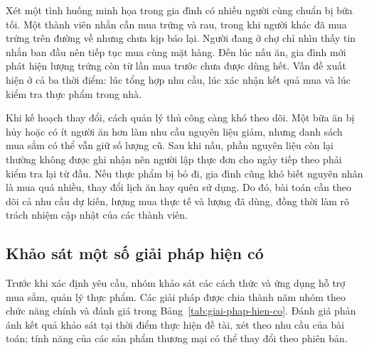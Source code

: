
Xét một tình huống minh họa trong gia đình có nhiều người cùng chuẩn bị bữa tối. Một thành viên nhắn cần mua trứng và rau, trong khi người khác đã mua trứng trên đường về nhưng chưa kịp báo lại. Người đang ở chợ chỉ nhìn thấy tin nhắn ban đầu nên tiếp tục mua cùng mặt hàng. Đến lúc nấu ăn, gia đình mới phát hiện lượng trứng còn từ lần mua trước chưa được dùng hết. Vấn đề xuất hiện ở cả ba thời điểm: lúc tổng hợp nhu cầu, lúc xác nhận kết quả mua và lúc kiểm tra thực phẩm trong nhà.

Khi kế hoạch thay đổi, cách quản lý thủ công càng khó theo dõi. Một bữa ăn bị hủy hoặc có ít người ăn hơn làm nhu cầu nguyên liệu giảm, nhưng danh sách mua sắm có thể vẫn giữ số lượng cũ. Sau khi nấu, phần nguyên liệu còn lại thường không được ghi nhận nên người lập thực đơn cho ngày tiếp theo phải kiểm tra lại từ đầu. Nếu thực phẩm bị bỏ đi, gia đình cũng khó biết nguyên nhân là mua quá nhiều, thay đổi lịch ăn hay quên sử dụng. Do đó, bài toán cần theo dõi cả nhu cầu dự kiến, lượng mua thực tế và lượng đã dùng, đồng thời làm rõ trách nhiệm cập nhật của các thành viên.

\subsection{Khảo sát một số giải pháp hiện có}\label{ssec:giai-phap-hien-co}

Trước khi xác định yêu cầu, nhóm khảo sát các cách thức và ứng dụng hỗ trợ mua sắm, quản lý thực phẩm. Các giải pháp được chia thành năm nhóm theo chức năng chính và đánh giá trong Bảng~\ref{tab:giai-phap-hien-co}. Đánh giá phản ánh kết quả khảo sát tại thời điểm thực hiện đề tài, xét theo nhu cầu của bài toán; tính năng của các sản phẩm thương mại có thể thay đổi theo phiên bản.

